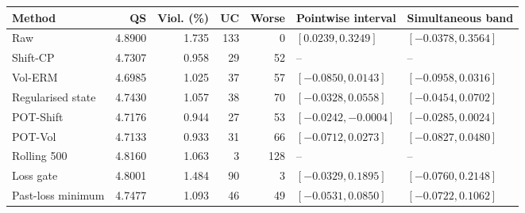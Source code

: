 \begingroup\setlength{\tabcolsep}{3pt}
\begin{tabular}{lrrrrll}
\toprule
Method & QS & Viol. (\%) & UC & Worse & Pointwise interval & Simultaneous band \\
\midrule
Raw & 4.8900 & 1.735 & 133 & 0 & $[0.0239, 0.3249]$ & $[-0.0378, 0.3564]$ \\
Shift-CP & 4.7307 & 0.958 & 29 & 52 & -- & -- \\
Vol-ERM & 4.6985 & 1.025 & 37 & 57 & $[-0.0850, 0.0143]$ & $[-0.0958, 0.0316]$ \\
Regularised state & 4.7430 & 1.057 & 38 & 70 & $[-0.0328, 0.0558]$ & $[-0.0454, 0.0702]$ \\
POT-Shift & 4.7176 & 0.944 & 27 & 53 & $[-0.0242, -0.0004]$ & $[-0.0285, 0.0024]$ \\
POT-Vol & 4.7133 & 0.933 & 31 & 66 & $[-0.0712, 0.0273]$ & $[-0.0827, 0.0480]$ \\
Rolling 500 & 4.8160 & 1.063 & 3 & 128 & -- & -- \\
Loss gate & 4.8001 & 1.484 & 90 & 3 & $[-0.0329, 0.1895]$ & $[-0.0760, 0.2148]$ \\
Past-loss minimum & 4.7477 & 1.093 & 46 & 49 & $[-0.0531, 0.0850]$ & $[-0.0722, 0.1062]$ \\
\bottomrule
\end{tabular}
\endgroup
